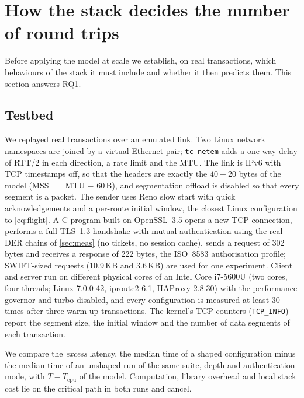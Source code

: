 \documentclass[preprint,12pt]{elsarticle}
\newcommand{\KB}{\,KB\xspace}
\begin{document}
\section{How the stack decides the number of round trips}
\label{sec:testbed}
Before applying the model at scale we establish, on real transactions, which behaviours of the stack it must include and whether it then predicts them. This section answers RQ1.

\subsection{Testbed}
We replayed real transactions over an emulated link. Two Linux network namespaces are joined by a virtual Ethernet pair; \texttt{tc netem} adds a one-way delay of RTT/2 in each direction, a rate limit and the MTU. The link is IPv6 with TCP timestamps off, so that the headers are exactly the $40+20$ bytes of the model (MSS $=$ MTU $-$ 60\,B), and segmentation offload is disabled so that every segment is a packet. The sender uses Reno slow start with quick acknowledgements and a per-route initial window, the closest Linux configuration to \cref{eq:flight}. A C program built on OpenSSL~3.5 opens a new TCP connection, performs a full TLS~1.3 handshake with mutual authentication using the real DER chains of \cref{sec:meas} (no tickets, no session cache), sends a request of 302 bytes and receives a response of 222 bytes, the ISO~8583 authorisation profile; SWIFT-sized requests (10.9\KB and 3.6\KB) are used for one experiment. Client and server run on different physical cores of an Intel Core i7-5600U (two cores, four threads; Linux 7.0.0-42, iproute2 6.1, HAProxy 2.8.30) with the performance governor and turbo disabled, and every configuration is measured at least 30 times after three warm-up transactions. The kernel's TCP counters (\texttt{TCP\_INFO}) report the segment size, the initial window and the number of data segments of each transaction.

We compare the \emph{excess} latency, the median time of a shaped configuration minus the median time of an unshaped run of the same suite, depth and authentication mode, with $T-T_\text{cpu}$ of the model. Computation, library overhead and local stack cost lie on the critical path in both runs and cancel.
\end{document}
